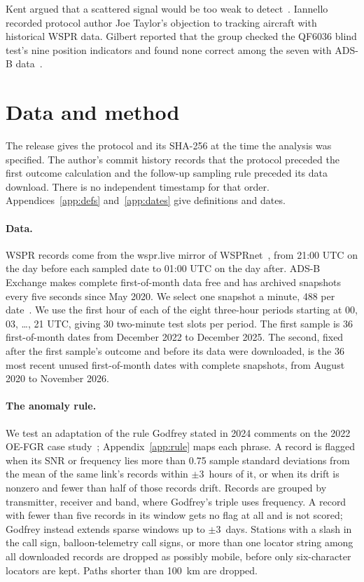 \documentclass[11pt]{article}
\begin{document}
Kent argued that a scattered signal would be too weak to detect~\cite{kent}. Iannello recorded protocol author Joe Taylor's objection to tracking aircraft with historical WSPR data. Gilbert reported that the group checked the QF6036 blind test's nine position indicators and found none correct among the seven with ADS-B data~\cite{iannello2021}.

\section{Data and method}\label{sec:method}

The release gives the protocol and its SHA-256 at the time the analysis was specified. The author's commit history records that the protocol preceded the first outcome calculation and the follow-up sampling rule preceded its data download. There is no independent timestamp for that order. Appendices~\ref{app:defs} and~\ref{app:dates} give definitions and dates.

\paragraph{Data.}\label{sec:data} WSPR records come from the wspr.live mirror of WSPRnet~\cite{wsprlive}, from 21:00 UTC on the day before each sampled date to 01:00 UTC on the day after. ADS-B Exchange makes complete first-of-month data free and has archived snapshots every five seconds since May 2020. We select one snapshot a minute, 488 per date~\cite{adsbx}. We use the first hour of each of the eight three-hour periods starting at 00, 03, \ldots, 21 UTC, giving 30 two-minute test slots per period. The first sample is 36 first-of-month dates from December 2022 to December 2025. The second, fixed after the first sample's outcome and before its data were downloaded, is the 36 most recent unused first-of-month dates with complete snapshots, from August 2020 to November 2026.

\paragraph{The anomaly rule.}\label{sec:rule} We test an adaptation of the rule Godfrey stated in 2024 comments on the 2022 OE-FGR case study~\cite{oefgr}; Appendix~\ref{app:rule} maps each phrase. A record is flagged when its SNR or frequency lies more than 0.75 sample standard deviations from the mean of the same link's records within $\pm3$~hours of it, or when its drift is nonzero and fewer than half of those records drift. Records are grouped by transmitter, receiver and band, where Godfrey's triple uses frequency. A record with fewer than five records in its window gets no flag at all and is not scored; Godfrey instead extends sparse windows up to $\pm3$~days. Stations with a slash in the call sign, balloon-telemetry call signs, or more than one locator string among all downloaded records are dropped as possibly mobile, before only six-character locators are kept. Paths shorter than 100~km are dropped.
\end{document}

